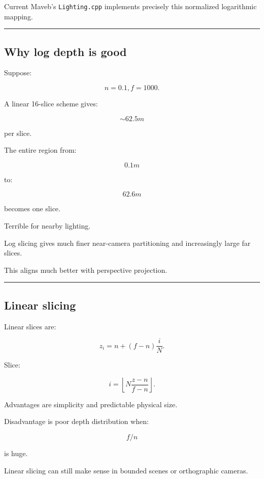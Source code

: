 Current Maveb's \texttt{Lighting.cpp} implements precisely this normalized logarithmic mapping.

\begin{center}\rule{0.5\linewidth}{0.5pt}\end{center}

\subsection{Why log depth is good}\label{04-visual-computing-ii-ch040-why-log-depth-is-good}

Suppose:

\[
n=0.1,
f=1000.
\]

A linear 16-slice scheme gives:

\[
\sim62.5m
\]

per slice.

The entire region from:

\[
0.1m
\]

to:

\[
62.6m
\]

becomes one slice.

Terrible for nearby lighting.

Log slicing gives much finer near-camera partitioning and increasingly large far slices.

This aligns much better with perspective projection.

\begin{center}\rule{0.5\linewidth}{0.5pt}\end{center}

\subsection{Linear slicing}\label{04-visual-computing-ii-ch040-linear-slicing}

Linear slices are:

\[
\boxed{
z_i=
n+
(f-n)\frac iN.
}
\]

Slice:

\[
\boxed{
i=
\left\lfloor
N
\frac{z-n}{f-n}
\right\rfloor.
}
\]

Advantages are simplicity and predictable physical size.

Disadvantage is poor depth distribution when:

\[
f/n
\]

is huge.

Linear slicing can still make sense in bounded scenes or orthographic cameras.

